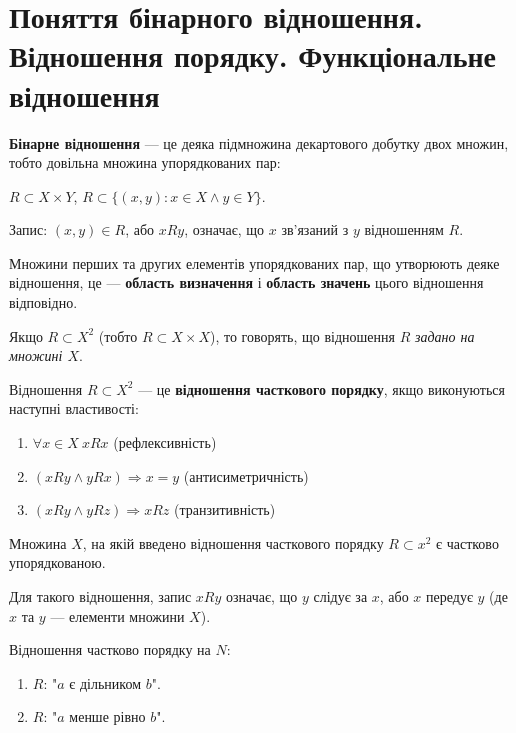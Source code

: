 \section{Поняття бінарного відношення. Відношення порядку. Функціональне відношення}

\begin{definition}
    \textbf{Бінарне відношення} --- це деяка підмножина декартового добутку
    двох множин, тобто довільна множина упорядкованих пар:

    $R \subset X \times Y$, $R \subset \{(x,y): x \in X \wedge y \in Y\}$.
\end{definition}

Запис: $(x,y) \in R$, або $xRy$, означає, що $x$ зв'язаний з $y$
відношенням $R$.

Множини перших та других елементів упорядкованих пар, що утворюють деяке відношення,
це --- \textbf{область визначення} і \textbf{область значень} цього відношення
відповідно.

Якщо $R \subset X^2$ (тобто $R \subset X \times X$), то говорять, що відношення
$R$ \textit{задано на множині $X$}.

\begin{definition}
    Відношення $R \subset X^2$ --- це \textbf{відношення часткового порядку}, якщо
    виконуються наступні властивості:
    \begin{enumerate}
        \item $\forall x \in X \: xRx$ (рефлексивність)
        \item $(xRy \wedge yRx) \Rightarrow x = y$ (антисиметричність)
        \item $(xRy \wedge yRz) \Rightarrow xRz$ (транзитивність)
    \end{enumerate}
\end{definition}

Множина $X$, на якій введено відношення часткового порядку $R \subset x^2$
є частково упорядкованою.

Для такого відношення, запис $xRy$ означає, що $y$ слідує за $x$, або $x$ передує $y$
(де $x$ та $y$ --- елементи множини $X$).

\begin{example}
    Відношення частково порядку на $N$:

    \begin{enumerate}
        \item $R$: "$a$ є дільником $b$".
        \item $R$: "$a$ менше рівно $b$".
    \end{enumerate}
\end{example}

